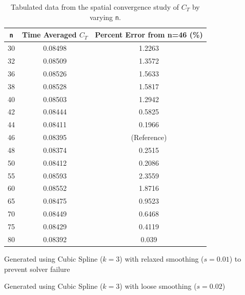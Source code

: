 \documentclass{report}
\begin{document}
\begin{table}[H]
    \centering
    \caption{Tabulated data from the spatial convergence study of $C_T$ by varying \texttt{n}.}\label{tab:n_richardson_percent_error}
    \begin{threeparttable}
        \begin{tabular*}{\textwidth}{@{\extracolsep{\fill}} c c c}
            \toprule
            \textbf{\texttt{n}} & \textbf{Time Averaged $C_T$} & \textbf{Percent Error from n=46 (\%)} \\
            \midrule
            30 & 0.08498 & 1.2263 \\
            32 & 0.08509 & 1.3572 \\
            36 & 0.08526 & 1.5633 \\
            38 & 0.08528 & 1.5817 \\
            40 & 0.08503 & 1.2942 \\
            42 & 0.08444 & 0.5825 \\
            44 & 0.08411 & 0.1966 \\
            46 & 0.08395 & (Reference) \\
            48\tnote{a} & 0.08374 & 0.2515 \\
            50\tnote{a} & 0.08412 & 0.2086 \\
            55\tnote{a} & 0.08593 & 2.3559 \\
            60\tnote{a} & 0.08552 & 1.8716 \\
            65\tnote{a} & 0.08475 & 0.9523 \\
            70\tnote{b} & 0.08449 & 0.6468 \\
            75\tnote{b} & 0.08429 & 0.4119 \\
            80\tnote{b} & 0.08392 & 0.039 \\

            \bottomrule
        \end{tabular*}
        \begin{tablenotes}
            \small
            \item [a] Generated using Cubic Spline ($k=3$) with relaxed smoothing ($s=0.01$) to prevent solver failure
            \item [b] Generated using Cubic Spline ($k=3$) with loose smoothing ($s=0.02$)
        \end{tablenotes}
    \end{threeparttable}
\end{table}
\end{document}
